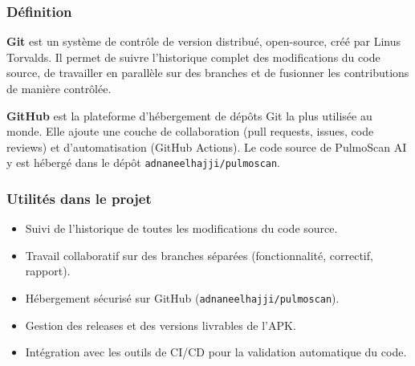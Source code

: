 \documentclass[12pt,a4paper]{report}
\begin{document}
\noindent\begin{minipage}[t]{0.66\textwidth}
\subsubsection*{Définition}
\textbf{Git} est un système de contrôle de version distribué, open-source, créé par Linus Torvalds. Il permet de suivre l'historique complet des modifications du code source, de travailler en parallèle sur des branches et de fusionner les contributions de manière contrôlée.

\textbf{GitHub} est la plateforme d'hébergement de dépôts Git la plus utilisée au monde. Elle ajoute une couche de collaboration (pull requests, issues, code reviews) et d'automatisation (GitHub Actions). Le code source de PulmoScan AI y est hébergé dans le dépôt \texttt{adnaneelhajji/pulmoscan}.
\end{minipage}\hfill
\begin{minipage}[t]{0.30\textwidth}
\vspace{0pt}
\begin{center}
\end{center}
\end{minipage}

\subsubsection*{Utilités dans le projet}
\begin{itemize}
  \item Suivi de l'historique de toutes les modifications du code source.
  \item Travail collaboratif sur des branches séparées (fonctionnalité, correctif, rapport).
  \item Hébergement sécurisé sur GitHub (\texttt{adnaneelhajji/pulmoscan}).
  \item Gestion des releases et des versions livrables de l'APK.
  \item Intégration avec les outils de CI/CD pour la validation automatique du code.
\end{itemize}
\end{document}
